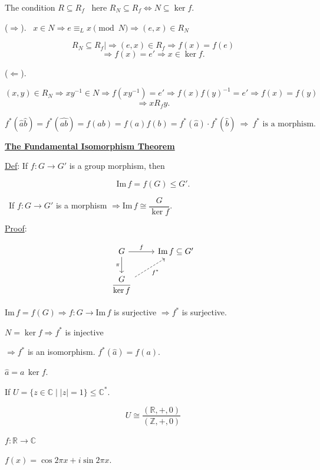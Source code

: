 \documentclass[12pt]{article}
\begin{document}
\noindent The condition $R\subseteq R_f$ \ here $R_N\subseteq R_f \Leftrightarrow N\subseteq\ker f$.

\bigskip
\noindent ($\Rightarrow$). \ $x\in N \Rightarrow e\equiv_L x \pmod N \Rightarrow (e,x)\in R_N$

\[
R_N\subseteq R_f \Big| \Rightarrow (e,x)\in R_f \Rightarrow f(x)=f(e)
\]
\[
\Rightarrow f(x)=e' \Rightarrow x\in\ker f.
\]

\bigskip
\noindent ($\Leftarrow$).

\[
(x,y)\in R_N \Rightarrow xy^{-1}\in N \Rightarrow f(xy^{-1})=e' \Rightarrow f(x)f(y)^{-1}=e' \Rightarrow f(x)=f(y)
\]
\[
\Rightarrow xR_fy.
\]

\bigskip
\noindent $f^*(\hat a\hat b) = f^*(\widehat{ab}) = f(ab) = f(a)f(b) = f^*(\hat a)\cdot f^*(\hat b) \ \Rightarrow \ f^*\text{ is a morphism.}$

\bigskip
\begin{center}
\underline{\textbf{The Fundamental Isomorphism Theorem}}
\end{center}

\noindent\underline{Def}: If $f:G\to G'$ is a group morphism, then

\[
\text{Im}\,f = f(G) \leq G'.
\]

\bigskip
\noindent{} \ If $f:G\to G'$ is a morphism $\Rightarrow \text{Im}\,f \cong \dfrac{G}{\ker f}$.

\bigskip
\noindent\underline{Proof}:

\[
\begin{tikzcd}
G \arrow[r,"f"] \arrow[d,"\pi"'] & \text{Im}\,f \subseteq G' \\
\dfrac{G}{\ker f} \arrow[ur, dashed,"f^*"'] &
\end{tikzcd}
\]

\bigskip
\noindent $\text{Im}\,f=f(G) \Rightarrow f:G\to\text{Im}\,f$ is surjective $\Rightarrow f^*$ is surjective.

\noindent $N=\ker f \Rightarrow f^*$ is injective

\noindent $\Rightarrow f^*$ is an isomorphism. \quad $f^*(\hat a) = f(a)$.

\noindent $\hat a = a\,\ker f$.

\bigskip
\noindent If $U=\{z\in\mathbb{C} \mid |z|=1\} \leq \mathbb{C}^*$.

\[
U \cong \frac{(\mathbb{R},+,0)}{(\mathbb{Z},+,0)}
\]

\noindent $f:\mathbb{R}\to\mathbb{C}$

\noindent $f(x) = \cos 2\pi x + i\sin 2\pi x$.
\end{document}
